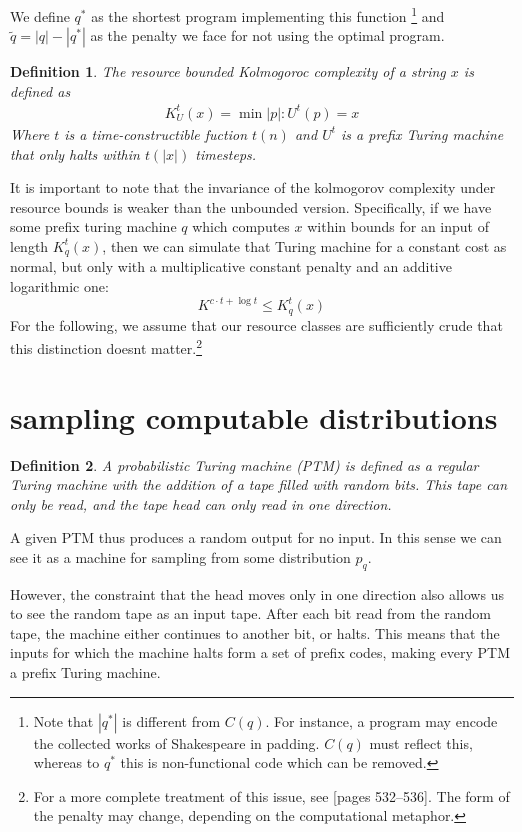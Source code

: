 \documentclass[10pt,a4paper,oneside]{article}
\newtheorem{dfn}{Definition}
\begin{document}
We define $q^*$ as the shortest program implementing this function \footnote{Note that $|q^*|$ is different from $C(q)$. For instance, a program may encode the collected works of Shakespeare in padding. $C(q)$ must reflect this, whereas to $q^*$ this is non-functional code which can be removed.} and $\tilde{q} = |q| - |q^*|$ as the penalty we face for not using the optimal program.

\begin{dfn}
The \emph{resource bounded Kolmogoroc complexity} of a string $x$ is defined as
\begin{align*}
K_U^t(x) = \min{|p| : U^t(p) = x}
\end{align*}
Where $t$ is a time-constructible fuction $t(n)$ and $U^t$ is a prefix Turing machine that only halts within $t(|x|)$ timesteps.
\end{dfn}

It is important to note that the invariance of the kolmogorov complexity under resource bounds is weaker than the unbounded version. Specifically, if we have some prefix turing machine $q$ which computes $x$ within bounds for an input of length $K^t_q(x)$, then we can simulate that Turing machine for a constant cost as normal, but only with a multiplicative constant penalty and an additive logarithmic one:
\[
K^{c \cdot t + \log t} \leq K^t_q(x)
\] 
For the following, we assume that our resource classes are sufficiently crude that this distinction doesnt matter.\footnote{For a more complete treatment of this issue, see \cite{li1993introduction}[pages 532--536]. The form of the penalty may change, depending on the computational metaphor.}

\section*{sampling computable distributions}

\begin{dfn}
A \emph{probabilistic Turing machine} (PTM) is defined as a regular Turing machine with the addition of a tape filled with random bits. This tape can only be read, and the tape head can only read in one direction.
\end{dfn}

A given PTM thus produces a random output for no input. In this sense we can see it as a machine for sampling from some distribution $p_q$. 

However, the constraint that the head moves only in one direction also allows us to see the random tape as an input tape. After each bit read from the random tape, the machine either continues to another bit, or halts. This means that the inputs for which the machine halts form a set of prefix codes, making every PTM a prefix Turing machine.
\end{document}
